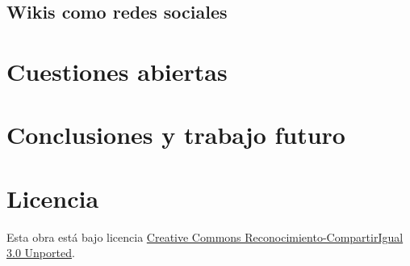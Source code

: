 \documentclass[11pt,onecolumn]{article}
\begin{document}

 \citep{kittur2010}

\subsection{Wikis como redes sociales}


\clearpage

\section{Cuestiones abiertas}


\clearpage

\section{Conclusiones y trabajo futuro}






\clearpage

        


\section*{Licencia}
Esta obra está bajo licencia \href{http://creativecommons.org/licenses/by-sa/3.0/}{Creative Commons Reconocimiento-CompartirIgual 3.0 Unported}.
\end{document}

